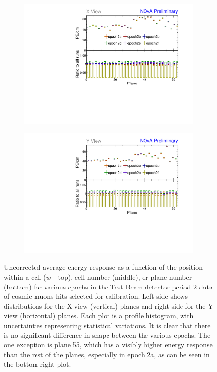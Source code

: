 \begin{figure}[!hbtp]
\begin{subfigure}[b]{0.495\textwidth}
\includegraphics[width=\textwidth]{Plots/TBCalibration/Attenprofs_P2Data_PlanePE_X_Combined.pdf}
\end{subfigure}
\begin{subfigure}[b]{0.495\textwidth}
\centering
\includegraphics[width=\textwidth]{Plots/TBCalibration/Attenprofs_P2Data_PlanePE_Y_Combined.pdf}
\end{subfigure}
\caption[Uncorrected energy response along $w$, cell and plane for period 2 data]{Uncorrected average energy response as a function of the position within a cell ($w$ - top), cell number (middle), or plane number (bottom) for various epochs in the Test Beam detector period 2 data of cosmic muons hits selected for calibration. Left side shows distributions for the X view (vertical) planes and right side for the Y view (horizontal) planes. Each plot is a profile histogram, with uncertainties representing statistical variations. It is clear that there is no significant difference in shape between the various epochs. The one  exception is plane 55, which has a visibly higher energy response than the rest of the planes, especially in epoch 2a, as can be seen in the bottom right plot.}
\label{fig:Calibhist_period2}
\end{figure}

